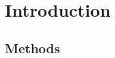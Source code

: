 \documentclass[sigconf]{acmart}
\begin{document}
\section{Introduction}

\subsection{Methods}
\end{document}
